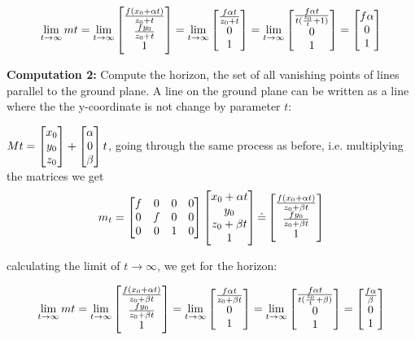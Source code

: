 $$\lim\limits_{t\rightarrow \infty} mt = \lim\limits_{t\rightarrow \infty}\left[\begin{matrix}\frac{f(x_0 + \alpha t)}{z_0 + t} \\ \frac{fy_0}{z_0 + t} \\ 1\end{matrix}\right] = \lim\limits_{t\rightarrow \infty}\left[\begin{matrix}\frac{f\alpha t}{z_0 + t} \\ 0 \\ 1\end{matrix}\right] = \lim\limits_{t\rightarrow \infty}\left[\begin{matrix}\frac{f\alpha t}{t(\frac{z_0}{t} + 1)} \\ 0 \\ 1\end{matrix}\right] = \left[\begin{matrix}f\alpha \\ 0 \\ 1\end{matrix}\right]$$

\textbf{Computation 2:} Compute the horizon, the set of all vanishing points of lines parallel to the ground plane. A line on the ground plane can be written as a line where the the y-coordinate is not change by parameter $t$:

$Mt = \left[\begin{matrix}x_0 \\ y_0 \\ z_0\end{matrix}\right] + \left[\begin{matrix}\alpha \\ 0 \\ \beta\end{matrix}\right]t$, going through the same process as before, i.e. multiplying the matrices we get $$m_t = \left[\begin{matrix}f&0&0&0 \\ 0&f&0&0 \\ 0&0&1&0\end{matrix}\right] \left[\begin{matrix}x_0 + \alpha t \\ y_0 \\ z_0 + \beta t \\ 1\end{matrix}\right]  \hat{=} \left[\begin{matrix}\frac{f(x_0 + \alpha t)}{z_0 + \beta t} \\ \frac{fy_0}{z_0 + \beta t} \\ 1\end{matrix}\right]$$

calculating the limit of $t\rightarrow \infty$, we get for the horizon:

$$\lim\limits_{t\rightarrow \infty} mt = \lim\limits_{t\rightarrow \infty}\left[\begin{matrix}\frac{f(x_0 + \alpha t)}{z_0 + \beta t} \\ \frac{fy_0}{z_0 + \beta t} \\ 1\end{matrix}\right] = \lim\limits_{t\rightarrow \infty}\left[\begin{matrix}\frac{f\alpha t}{z_0 + \beta t} \\ 0 \\ 1\end{matrix}\right] = \lim\limits_{t\rightarrow \infty}\left[\begin{matrix}\frac{f\alpha t}{t(\frac{z_0}{t} + \beta)} \\ 0 \\ 1\end{matrix}\right] = \left[\begin{matrix}\frac{f\alpha}{\beta} \\ 0 \\ 1\end{matrix}\right]$$

